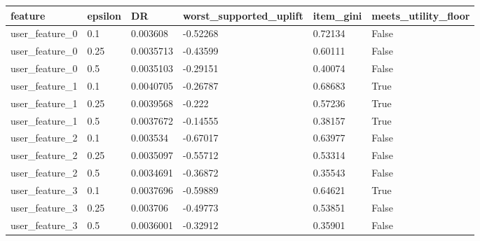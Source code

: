 \begin{tabular}{llllll}
\hline
feature & epsilon & DR & worst\_supported\_uplift & item\_gini & meets\_utility\_floor \\
\hline
user\_feature\_0 & 0.1 & 0.003608 & -0.52268 & 0.72134 & False \\
user\_feature\_0 & 0.25 & 0.0035713 & -0.43599 & 0.60111 & False \\
user\_feature\_0 & 0.5 & 0.0035103 & -0.29151 & 0.40074 & False \\
user\_feature\_1 & 0.1 & 0.0040705 & -0.26787 & 0.68683 & True \\
user\_feature\_1 & 0.25 & 0.0039568 & -0.222 & 0.57236 & True \\
user\_feature\_1 & 0.5 & 0.0037672 & -0.14555 & 0.38157 & True \\
user\_feature\_2 & 0.1 & 0.003534 & -0.67017 & 0.63977 & False \\
user\_feature\_2 & 0.25 & 0.0035097 & -0.55712 & 0.53314 & False \\
user\_feature\_2 & 0.5 & 0.0034691 & -0.36872 & 0.35543 & False \\
user\_feature\_3 & 0.1 & 0.0037696 & -0.59889 & 0.64621 & True \\
user\_feature\_3 & 0.25 & 0.003706 & -0.49773 & 0.53851 & False \\
user\_feature\_3 & 0.5 & 0.0036001 & -0.32912 & 0.35901 & False \\
\hline
\end{tabular}